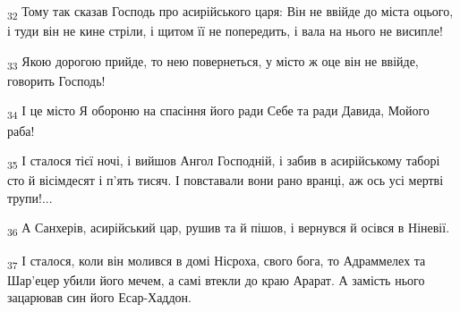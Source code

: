 \begin{tcolorbox}
\textsubscript{32} Тому так сказав Господь про асирійського царя: Він не ввійде до міста оцього, і туди він не кине стріли, і щитом її не попередить, і вала на нього не висипле!
\end{tcolorbox}
\begin{tcolorbox}
\textsubscript{33} Якою дорогою прийде, то нею повернеться, у місто ж оце він не ввійде, говорить Господь!
\end{tcolorbox}
\begin{tcolorbox}
\textsubscript{34} І це місто Я обороню на спасіння його ради Себе та ради Давида, Мойого раба!
\end{tcolorbox}
\begin{tcolorbox}
\textsubscript{35} І сталося тієї ночі, і вийшов Ангол Господній, і забив в асирійському таборі сто й вісімдесят і п'ять тисяч. І повставали вони рано вранці, аж ось усі мертві трупи!...
\end{tcolorbox}
\begin{tcolorbox}
\textsubscript{36} А Санхерів, асирійський цар, рушив та й пішов, і вернувся й осівся в Ніневії.
\end{tcolorbox}
\begin{tcolorbox}
\textsubscript{37} І сталося, коли він молився в домі Нісроха, свого бога, то Адраммелех та Шар'ецер убили його мечем, а самі втекли до краю Арарат. А замість нього зацарював син його Есар-Хаддон.
\end{tcolorbox}
